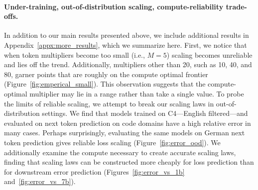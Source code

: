 
\paragraph{Under-training, out-of-distribution scaling, compute-reliability trade-offs.}
In addition to our main results presented above, we include additional results in Appendix~\ref{appx:more_results}, which we summarize here.
First, we notice that when token multipliers become too small (i.e., $M=5$) scaling becomes unreliable and lies off the trend.
Additionally, multipliers other than 20, such as 10, 40, and 80, garner points that are roughly on the compute optimal frontier (Figure~\ref{fig:emperical_small}).
This observation suggests that the compute-optimal multiplier may lie in a range rather than take a single value.
To probe the limits of reliable scaling, we attempt to break our scaling laws in out-of-distribution settings.
We find that models trained on C4---English filtered---and evaluated on next token prediction on code domains have a high relative error in many cases. Perhaps surprisingly, evaluating the same models on German next token prediction gives reliable loss scaling (Figure~\ref{fig:error_ood}).
We additionally examine the compute necessary to create accurate scaling laws, finding
that scaling laws can be constructed more cheaply for loss prediction than for downstream error prediction (Figures~\ref{fig:error_vs_1b} and~\ref{fig:error_vs_7b}).

